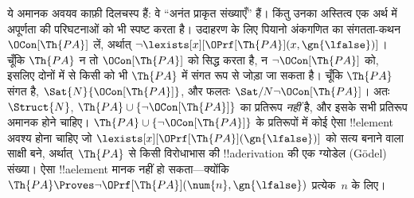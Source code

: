 \documentclass[../../../include/open-logic-section]{subfiles}
\begin{document}
ये अमानक अवयव काफ़ी दिलचस्प हैं: वे “अनंत प्राकृत संख्याएँ” हैं। किंतु उनका
अस्तित्व एक अर्थ में अपूर्णता की परिघटनाओं को भी स्पष्ट करता है। उदाहरण के
लिए पियानो अंकगणित का संगतता-कथन $\OCon[\Th{PA}]$ लें, अर्थात् $\lnot
\lexists[x][\OPrf[\Th{PA}](x, \gn{\lfalse})]$। चूँकि $\Th{PA}$ न तो
$\OCon[\Th{PA}]$ को सिद्ध करता है, न $\lnot \OCon[\Th{PA}]$ को, इसलिए
दोनों में से किसी को भी $\Th{PA}$ में संगत रूप से जोड़ा जा सकता है। चूँकि
$\Th{PA}$ संगत है, $\Sat{N}{\OCon[\Th{PA}]}$, और फलतः
$\Sat/{N}{\lnot
  \OCon[\Th{PA}]}$। अतः $\Struct{N}$, $\Th{PA}
\cup \{\lnot \OCon[\Th{PA}]\}$ का प्रतिरूप \emph{नहीं} है, और इसके
सभी प्रतिरूप अमानक होने चाहिए।
$\Th{PA} \cup \{\lnot \OCon[\Th{PA}]\}$ के प्रतिरूपों में कोई ऐसा
!!{element} अवश्य होना चाहिए
जो $\lexists[x][\OPrf[\Th{PA}](\gn{\lfalse})]$ को सत्य बनाने वाला साक्षी
बने, अर्थात्~$\Th{PA}$ से किसी विरोधाभास की !!a{derivation} की एक ग्योडेल
(G\"odel) संख्या। ऐसा !!a{element} मानक नहीं हो सकता---क्योंकि
$\Th{PA} \Proves \lnot
\OPrf[\Th{PA}](\num{n}, \gn{\lfalse})$ प्रत्येक~$n$ के लिए।
\end{document}
